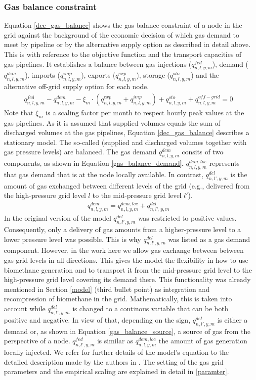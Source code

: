 \subsubsection{Gas balance constraint}
Equation \ref{dec_gas_balance} shows the gas balance constraint of a node in the grid against the background of the economic decision of which gas demand to meet by pipeline or by the alternative supply option as described in detail above. This is with reference to the objective function and the transport capacities of gas pipelines. It establishes a balance between gas injections ($q^{fed}_{n,l,y,m}$), demand ($q^{dem}_{n,l,y,m}$), imports ($q^{imp}_{n,l,y,m}$), exports ($q^{exp}_{n,l,y,m}$), storage ($q^{sto}_{n,l,y,m}$) and the alternative off-grid supply option for each node.
\begin{align}\label{dec_gas_balance}
	q^{fed}_{n,l,y,m} - q^{dem}_{n,l,y,m} - \xi_m \cdot \left(q^{exp}_{n,l,y,m} + q^{imp}_{n,l,y,m}\right) + q^{sto}_{n,l,y,m}+q^{off-grid}_{n,l,y,m}=0
\end{align}
Note that $\xi_m$ is a scaling factor per month to respect hourly peak values at the gas pipelines. As it is assumed that supplied volumes equals the sum of discharged volumes at the gas pipelines, Equation \ref{dec_gas_balance} describes a stationary model. The so-called (supplied and discharged volumes together with gas pressure levels) are balanced. The gas demand $q^{dem}_{n,l,y,m}$ consits of two components, as shown in Equation \ref{gas_balance_demand}. $q^{dem,loc}_{n,l,y,m}$ represents that gas demand that is at the node locally available. In contrast, $q^{del}_{n,l',y,m}$ is the amount of gas exchanged between different levels of the grid (e.g., delivered from the high-pressure grid level $l$ to the mid-pressure grid level $l'$). 
\begin{align}\label{gas_balance_demand}
	q^{dem}_{n,l,y,m} = q^{dem,loc}_{n,l,y,m} + q^{del}_{n,l',y,m}
\end{align}
In the original version of the model $q^{del}_{n,l',y,m}$ was restricted to positive values. Consequently, only a delivery of gas amounts from a higher-pressure level to a lower pressure level was possible. This is why $q^{del}_{n,l',y,m}$ was listed as a gas demand component. However, in the work here we allow gas exchange between between gas grid levels in all directions. This gives the model the flexibility in how to use biomethane generation and to transport it from the mid-pressure grid level to the high-pressure grid level covering its demand there. This functionality was already mentioned in Section \ref{model} (third bullet point) as integration and recompression of biomethane in the grid. Mathematically, this is taken into account while $q^{del}_{n,l',y,m}$ is changed to a continous variable that can be both positive and negative. In view of that, depending on the sign, $q^{del}_{n,l',y,m}$ is either a demand or, as shown in Equation \ref{gas_balance_source}, a source of gas from the perspective of a node. $q^{fed}_{n,l',y,m}$ is similar as $q^{dem,loc}_{n,l,y,m}$ the amount of gas generation locally injected. We refer for further details of the model's equation to the detailed description made by the authors in \cite{zwickl2023design}. The setting of the gas grid parameters and the empirical scaling are explained in detail in \ref{paramter}. 

